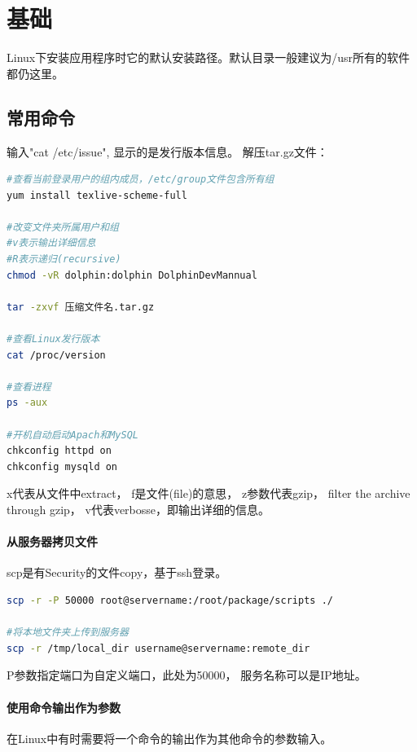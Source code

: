 \documentclass{book}
\begin{document}
\section{基础}

Linux下安装应用程序时它的默认安装路径。默认目录一般建议为/usr所有的软件都仍这里。

\subsection{常用命令}

输入"cat /etc/issue", 显示的是发行版本信息。
解压tar.gz文件：

\begin{lstlisting}[language=Bash]
#查看当前登录用户的组内成员，/etc/group文件包含所有组
yum install texlive-scheme-full

#改变文件夹所属用户和组
#v表示输出详细信息
#R表示递归(recursive)
chmod -vR dolphin:dolphin DolphinDevMannual

tar -zxvf 压缩文件名.tar.gz

#查看Linux发行版本
cat /proc/version

#查看进程
ps -aux

#开机自动启动Apach和MySQL
chkconfig httpd on
chkconfig mysqld on
\end{lstlisting}

x代表从文件中extract，
f是文件(file)的意思，
z参数代表gzip，
filter the archive through gzip，
v代表verbosse，即输出详细的信息。

\paragraph{从服务器拷贝文件}

scp是有Security的文件copy，基于ssh登录。 

\begin{lstlisting}[language=Bash]
scp -r -P 50000 root@servername:/root/package/scripts ./

#将本地文件夹上传到服务器
scp -r /tmp/local_dir username@servername:remote_dir
\end{lstlisting}

P参数指定端口为自定义端口，此处为50000，
服务名称可以是IP地址。

\paragraph{使用命令输出作为参数}

在Linux中有时需要将一个命令的输出作为其他命令的参数输入。
\end{document}
